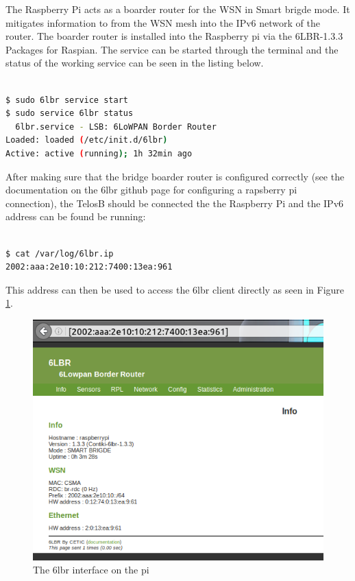 The Raspberry Pi acts as a boarder router for the WSN in Smart brigde mode. It mitigates information to from the WSN mesh into the IPv6 network of the router. The boarder router is installed into the Raspberry pi via the 6LBR-1.3.3 Packages for Raspian. The service can be started through the terminal and the status of the working service can be seen in the listing below.

\begin{lstlisting}[basicstyle=\small,language=bash,caption={Start the 6lbr service and check the status}]

$ sudo 6lbr service start
$ sudo service 6lbr status
  6lbr.service - LSB: 6LoWPAN Border Router
Loaded: loaded (/etc/init.d/6lbr)
Active: active (running); 1h 32min ago
\end{lstlisting}

After making sure that the bridge boarder router is configured correctly (see the documentation on the 6lbr github page for configuring a rapsberry pi connection), the TelosB should be connected the the Raspberry Pi and the IPv6 address can be found be running: 
 
\begin{lstlisting}[basicstyle=\small,language=bash,caption={Get the TelosB node IPv6 address for accessing the 6lbr client}]

$ cat /var/log/6lbr.ip 
2002:aaa:2e10:10:212:7400:13ea:961
\end{lstlisting}

This address can then be used to access the 6lbr client directly as seen in Figure \ref{fig:interface}.

\begin{figure}[!h]
	\begin{center}
		\includegraphics[width=1\linewidth]{interface}
		\caption{The 6lbr interface on the pi}
		\label{fig:interface}
	\end{center}
\end{figure} 

